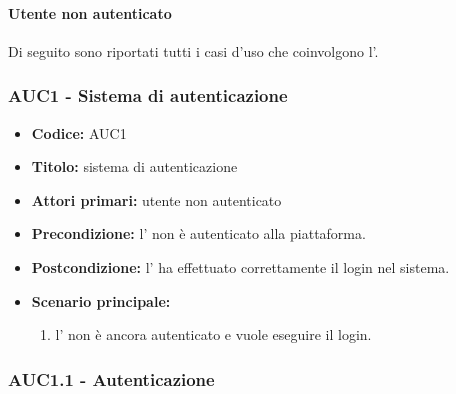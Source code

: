 \documentclass[casi-duso]{subfiles}
\begin{document}
\paragraph{Utente non autenticato}%
\label{par:utente-non-autenticato}
Di seguito sono riportati tutti i casi d'uso che coinvolgono l'.

\subsubsection{AUC1 - Sistema di autenticazione}%
\label{subsub:AUC1}

\begin{itemize}
  \item \textbf{Codice:} AUC1
  \item \textbf{Titolo:} sistema di autenticazione
  \item \textbf{Attori primari:} utente non autenticato
  \item \textbf{Precondizione:} l' non è autenticato alla piattaforma.
  \item \textbf{Postcondizione:} l' ha effettuato correttamente il login nel sistema.
  \item \textbf{Scenario principale:}
  \begin{enumerate}
    \item l' non è ancora autenticato e vuole eseguire il login.
  \end{enumerate}
\end{itemize}

\subsubsection{AUC1.1 - Autenticazione}%
\label{subsub:AUC1.1}
\end{document}
